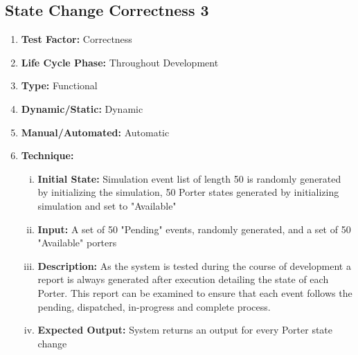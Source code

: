 \documentclass[paper=letter, fontsize=10pt]{scrartcl}
\numberwithin{equation}{section}		%
\numberwithin{figure}{section}			%
\numberwithin{table}{section}				%
\begin{document}
\subsection{State Change Correctness 3}
\begin{enumerate}[]
	\item \textbf{Test Factor:} Correctness
	\item \textbf{Life Cycle Phase:} Throughout Development
	\item \textbf{Type:} Functional
	\item \textbf{Dynamic/Static:} Dynamic
	\item \textbf{Manual/Automated:} Automatic
	\item \textbf{Technique:}
		\begin{enumerate}[(i)]
			\item \textbf{Initial State:} Simulation event list of length 50 is randomly generated by initializing the simulation, 50 Porter states generated by initializing simulation and set to "Available"
			\item \textbf{Input:} A set of 50 "Pending" events, randomly generated, and a set of 50 "Available" porters
			\item \textbf{Description:} As the system is tested during the course of development a report is always generated after execution detailing the state of each Porter. This report can be examined to ensure that each event follows the pending, dispatched, in-progress and complete process. 
			\item \textbf{Expected Output:} System returns an output for every Porter state change
		\end{enumerate}
\end{enumerate}
\end{document}
